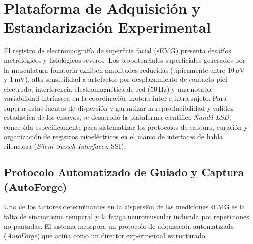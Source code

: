 
\section{Plataforma de Adquisición y Estandarización Experimental}
\label{sec:plataforma_software}

El registro de electromiografía de superficie facial (sEMG) presenta desafíos metrológicos y fisiológicos severos. Los biopotenciales superficiales generados por la musculatura fonatoria exhiben amplitudes reducidas (típicamente entre $10\,\mu\text{V}$ y $1\,\text{mV}$), alta sensibilidad a artefactos por desplazamiento de contacto piel-electrodo, interferencia electromagnética de red ($50\,\text{Hz}$) y una notable variabilidad intrínseca en la coordinación motora inter e intra-sujeto. Para superar estas fuentes de dispersión y garantizar la reproducibilidad y validez estadística de los ensayos, se desarrolló la plataforma científica \textit{Ñandú LSD}, concebida específicamente para sistematizar los protocolos de captura, curación y organización de registros mioeléctricos en el marco de interfaces de habla silenciosa (\textit{Silent Speech Interfaces}, SSI).

\subsection{Protocolo Automatizado de Guiado y Captura (AutoForge)}
\label{subsec:protocolo_autoforge}

Uno de los factores determinantes en la dispersión de las mediciones sEMG es la falta de sincronismo temporal y la fatiga neuromuscular inducida por repeticiones no pautadas. El sistema incorpora un protocolo de adquisición automatizado (\textit{AutoForge}) que actúa como un director experimental estructurado:

